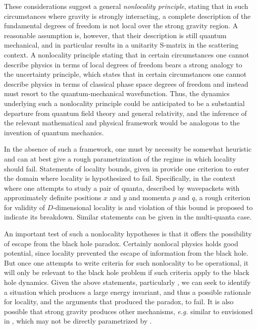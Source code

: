 These considerations suggest a general {\it nonlocality principle}, stating that in such circumstances where gravity is strongly interacting, a complete description of the fundamental degrees of freedom is not local over the strong gravity region.  A reasonable assumption is, however, that their description is still quantum mechanical, and in particular results in a unitarity S-matrix in the scattering context.  A nonlocality principle stating that in certain circumstances one cannot describe physics in terms of local degrees of freedom bears a strong analogy to the uncertainty principle, which states that in certain circumstances one cannot describe physics in terms of classical phase space degrees of freedom and instead must resort to the quantum-mechanical wavefunction.  Thus, the dynamics underlying such a nonlocality principle could be anticipated to be a substantial departure from quantum field theory and general relativity, and the inference of the relevant mathematical and physical framework would be analogous to the invention of quantum mechanics.

In the absence of such a framework, one must by necessity be somewhat heuristic and 
can at best give a rough parametrization of the regime in which locality should fail.  Statements of locality bounds, given in  provide one criterion to enter the domain where locality is hypothesized to fail.  Specifically, in the context where one attempts to study a pair of quanta, described by wavepackets with approximately definite positions $x$ and $y$ and momenta $p$ and $q$, a rough criterion for validity of $D$-dimensional locality is
%
\eqn{}
%
and violation of this bound is proposed to indicate its breakdown.
Similar statements can be given in the multi-quanta case\SGloc.

An important test of such a nonlocality hypotheses is that it offers the possibility of escape from the black hole paradox.  Certainly nonlocal physics holds good potential, since locality prevented the escape of information from the black hole.  But once one attempts to write criteria for such nonlocality to be operational, it will only be relevant to the black hole problem if such criteria apply to the black hole dynamics.  Given the above statements, particularly \locbd, we can seek to identify a situation which produces a large energy invariant, and thus a possible rationale for locality, and the arguments that produced the paradox, to fail.  It is also possible that strong gravity produces other mechanisms, {\it e.g.} similar to envisioned in \BHMR, which may not be directly parametrized by \locbd.


